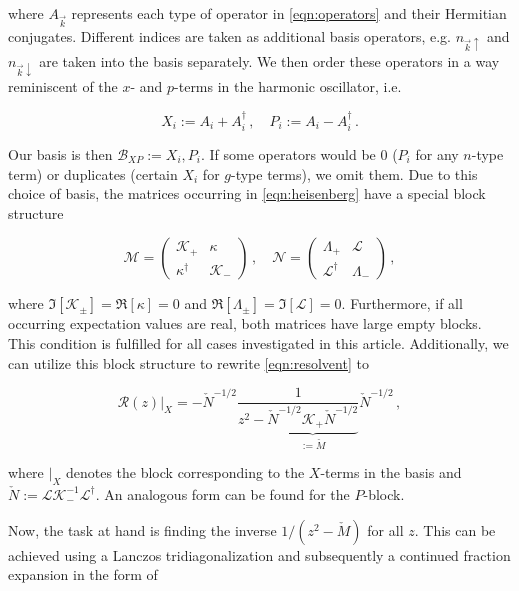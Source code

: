 \documentclass[
    reprint, 
    aps,
    preprintnumbers,
    twocolumn,
    prb,
    superscriptaddress
]{revtex4-2}
\newcommand{\vk}{\vec{k}}
\newcommand{\up}{\uparrow}
\newcommand{\down}{\downarrow}
\begin{document}
where $A_{\vk}$ represents each type of operator in \eqref{eqn:operators} and their Hermitian conjugates.
Different indices are taken as additional basis operators, e.g. $n_{\vk \up}$ and $n_{\vk \down}$ are taken into the basis separately.
We then order these operators in a way reminiscent of the $x$- and $p$-terms in the harmonic oscillator, i.e.

\begin{equation}
    X_i := A_i + A_i^\dagger\,,\quad P_i := A_i - A_i^\dagger\,.
\end{equation}

Our basis is then $\mathcal{B}_{XP} := {X_i, P_i}$.
If some operators would be 0 ($P_i$ for any $n$-type term) or duplicates (certain $X_i$ for $g$-type terms), we omit them.
\newline
Due to this choice of basis, the matrices occurring in \eqref{eqn:heisenberg} have a special block structure

\begin{equation}
    \mathcal{M} = \begin{pmatrix}
        \mathcal{K}_+ & \kappa \\ \kappa^\dagger & \mathcal{K}_-
    \end{pmatrix}\,,\quad \mathcal{N} = \begin{pmatrix}
        \Lambda_+ & \mathcal{L} \\ \mathcal{L}^\dagger & \Lambda_-
    \end{pmatrix}\,,
\end{equation}

where $\Im [\mathcal{K}_\pm] = \Re [\kappa] = 0$ and $\Re [\Lambda_\pm] = \Im [\mathcal{L}] = 0$.
Furthermore, if all occurring expectation values are real, both matrices have large empty blocks.
This condition is fulfilled for all cases investigated in this article.
Additionally, we can utilize this block structure to rewrite \eqref{eqn:resolvent} to

\begin{equation}
    \mathcal{R}(z) \vert_X = - \check{N}^{-1/2} \frac{1}{z^2 - \underbrace{\check{N}^{-1/2} \mathcal{K}_+ \check{N}^{-1/2}}_{:= \check{M}}} \check{N}^{-1/2}\,,
\end{equation}

where $\vert_X$ denotes the block corresponding to the $X$-terms in the basis and $\check{N} := \mathcal{L} \mathcal{K}_-^{-1} \mathcal{L}^\dagger$.
An analogous form can be found for the $P$-block.

Now, the task at hand is finding the inverse $1/(z^2 - \check{M})$ for all $z$.
This can be achieved using a Lanczos tridiagonalization and subsequently a continued fraction expansion in the form of
\end{document}
